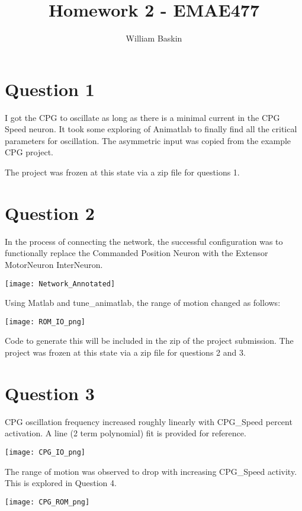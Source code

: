 \documentclass[12pt, letterpaper, oneside, notitlepage, onecolumn]{article}
\author{William Baskin}
\title{Homework 2 - EMAE477}
\begin{document}
\maketitle

\section{Question 1}


I got the CPG to oscillate as long as there is a minimal current in the CPG Speed neuron. It took some exploring of Animatlab to finally find all the critical parameters for oscillation. The asymmetric input was copied from the example CPG project.

The project was frozen at this state via a zip file for questions 1.

\section{Question 2}

In the process of connecting the network, the successful configuration was to functionally replace the Commanded Position Neuron with the Extensor MotorNeuron InterNeuron. 

\texttt{[image: Network\_Annotated]}

Using Matlab and tune\_animatlab, the range of motion changed as follows:

\texttt{[image: ROM\_IO\_png]}

Code to generate this will be included in the zip of the project submission. The project was frozen at this state via a zip file for questions 2 and 3.

\section{Question 3}

CPG oscillation frequency increased roughly linearly with CPG\_Speed percent activation. A line (2 term polynomial) fit is provided for reference.

\texttt{[image: CPG\_IO\_png]}

The range of motion was observed to drop with increasing CPG\_Speed activity. This is explored in Question 4.

\texttt{[image: CPG\_ROM\_png]}
\end{document}
